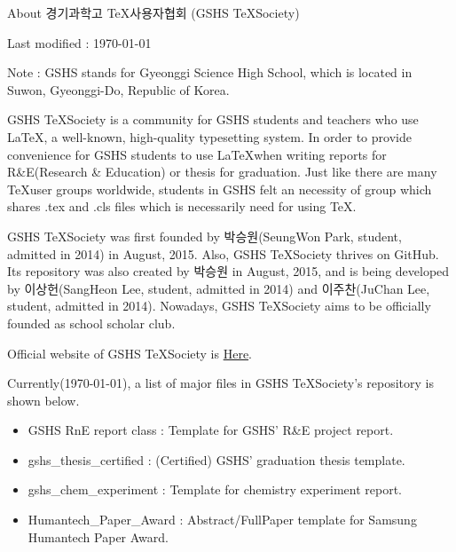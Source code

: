 \documentclass[11pt]{article}
\begin{document}
	\begin{center}
		\Large About 경기과학고 \TeX 사용자협회 (GSHS \TeX Society)
	\end{center}
	\begin{flushright}
		Last modified : \today
	\end{flushright}
	

Note : GSHS stands for Gyeonggi Science High School, which is located in Suwon, Gyeonggi-Do, Republic of Korea. 

GSHS \TeX Society is a community for GSHS students and teachers who use \LaTeX, a well-known, high-quality typesetting system.
In order to provide convenience for GSHS students to use \LaTeX when writing reports for R\&E(Research \& Education) or thesis for graduation. Just like there are many \TeX user groups worldwide, students in GSHS felt an necessity of group which shares .tex and .cls files which is necessarily need for using \TeX.

GSHS \TeX Society was first founded by 박승원(SeungWon Park, student, admitted in 2014) in August, 2015. Also, GSHS \TeX Society thrives on GitHub. Its repository was also created by 박승원 in August, 2015, and is being developed by 이상헌(SangHeon Lee, student, admitted in 2014) and 이주찬(JuChan Lee, student, admitted in 2014). Nowadays, GSHS \TeX Society aims to be officially founded as school scholar club.

Official website of GSHS \TeX Society is \href{http://gshslatexintro.github.io/}{Here}.

Currently(\today), a list of major files in GSHS \TeX Society's repository is shown below.
\begin{itemize}
\item GSHS RnE report class : Template for GSHS' R\&E project report.
\item gshs\_thesis\_certified : (Certified) GSHS' graduation thesis template.
\item gshs\_chem\_experiment : Template for chemistry experiment report.
\item Humantech\_Paper\_Award : Abstract/FullPaper template for Samsung Humantech Paper Award.
\end{itemize}
\end{document}
